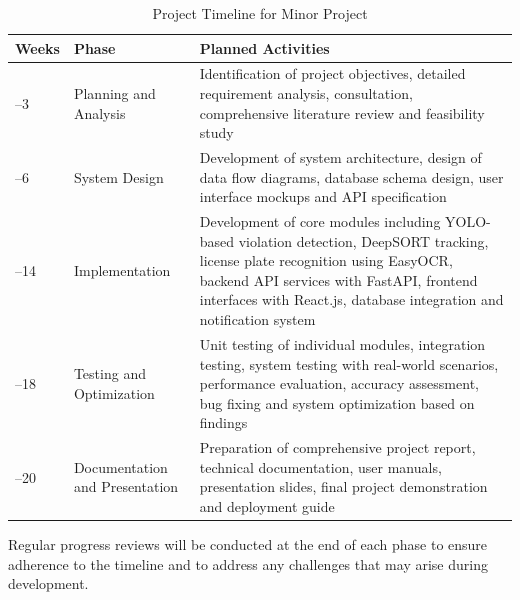 \documentclass[12pt, a4paper, oneside]{memoir}
\begin{document}
\begin{table}[htbp]
\centering
\caption{Project Timeline for Minor Project}
\label{tab:project_timeline}
\renewcommand{\arraystretch}{1.1}
\small
\begin{tabular}{|>{\centering\arraybackslash}p{2.2cm} 
                |>{\raggedright\arraybackslash}p{3.2cm} 
                |>{\raggedright\arraybackslash}p{6.3cm}|}
\hline
\textbf{Weeks} & \textbf{Phase} & \textbf{Planned Activities} \\
\hline
1--3  & Planning and Analysis 
      & Identification of project objectives, detailed requirement analysis, consultation, comprehensive literature review and feasibility study \\
\hline
4--6  & System Design 
      & Development of system architecture, design of data flow diagrams, database schema design, user interface mockups and API specification \\
\hline
7--14 & Implementation 
      & Development of core modules including YOLO-based violation detection, DeepSORT tracking, license plate recognition using EasyOCR, backend API services with FastAPI, frontend interfaces with React.js, database integration and notification system \\
\hline
15--18 & Testing and Optimization 
       & Unit testing of individual modules, integration testing, system testing with real-world scenarios, performance evaluation, accuracy assessment, bug fixing and system optimization based on findings \\
\hline
19--20 & Documentation and Presentation
       & Preparation of comprehensive project report, technical documentation, user manuals, presentation slides, final project demonstration and deployment guide \\
\hline
\end{tabular}
\end{table}

Regular progress reviews will be conducted at the end of each phase to ensure adherence to the timeline and to address any challenges that may arise during development.

\backmatter
\nocite{*}
\printbibliography[heading=bibintoc, title={References/Bibliography}]
\end{document}
